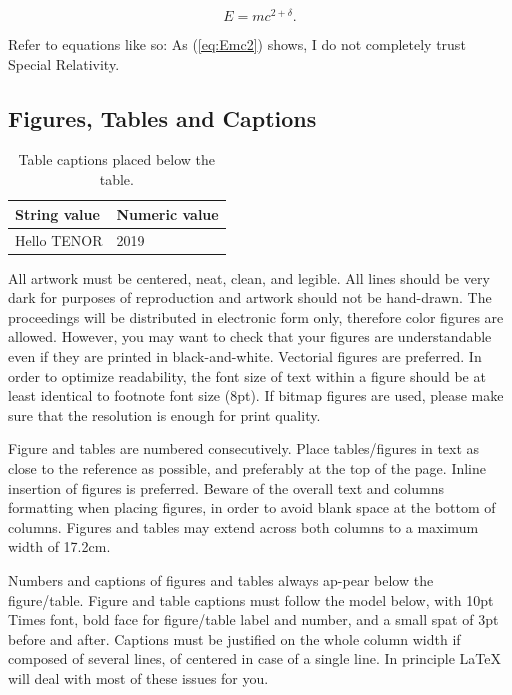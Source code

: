 \documentclass{article}
\begin{document}
\begin{equation}
E=mc^{2+\delta}.
\label{eq:Emc2}
\end{equation}

Refer to equations like so:
As (\ref{eq:Emc2}) shows, 
I do not completely trust Special Relativity.

\subsection{Figures, Tables and Captions}

\begin{table}[ht!]  %
\centering 
\begin{tabular}{|l|l|}
  \hline
  String value & Numeric value \\
  \hline
  Hello TENOR  & 2019 \\
  \hline
 \end{tabular}
 \caption{Table captions placed below the table.}
 \label{tab:example}
\end{table}

All artwork must be centered, neat, clean, and legible. 
All lines should be very dark for purposes of reproduction and artwork should not be hand-drawn. The proceedings will be distributed in electronic form only, therefore color figures are allowed.
However, you may want to check that your figures are understandable even if they are printed in black-and-white. 
Vectorial figures are preferred. 
In order to optimize readability, the font size of text within a figure should be at least identical to footnote font size (8pt). 
If bitmap figures are used, please make sure that the resolution is enough for print quality. 

Figure and tables are numbered consecutively. Place tables/figures in text as close to the reference as possible, and preferably at the top of the page. Inline insertion of figures is preferred. Beware of the overall text and columns formatting when placing figures, in order to avoid blank space at the bottom of columns. 
Figures and tables may extend across both columns to a maximum width of 17.2cm.

Numbers and captions of figures and tables always ap-pear below the figure/table. Figure and table captions must follow the model below, with 10pt Times font, bold face for figure/table label and number, and a small spat of 3pt before and after. Captions must be justified on the whole column width if composed of several lines, of centered in case of a single line. 
In principle \LaTeX{} will deal with most of these issues for you.
\end{document}

